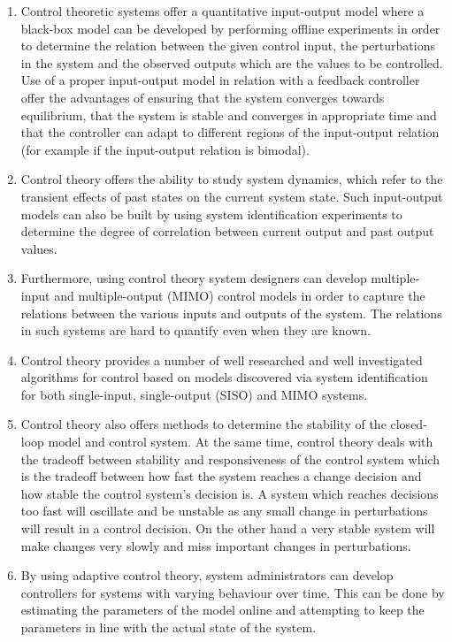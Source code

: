 \begin{enumerate}
	\item Control theoretic systems offer a quantitative input-output model where a black-box model can be developed by performing offline experiments in order to determine the relation between the given control input, the perturbations in the system and the observed outputs which are the values to be controlled. Use of a proper input-output model in relation with a feedback controller offer the advantages of ensuring that the system converges towards equilibrium, that the system is stable and converges in appropriate time and that the controller can adapt to different regions of the input-output relation (for example if the input-output relation is bimodal).
	\item Control theory offers the ability to study system dynamics, which refer to the transient effects of past states on the current system state. Such input-output models can also be built by using system identification experiments to determine the degree of correlation between current output and past output values.
	\item Furthermore, using control theory system designers can develop multiple-input and multiple-output (MIMO) control models in order to capture the relations between the various inputs and outputs of the system. The relations in such systems are hard to quantify even when they are known.
	\item Control theory provides a number of well researched and well investigated algorithms for control based on models discovered via system identification for both single-input, single-output (SISO) and MIMO systems.
	\item Control theory also offers methods to determine the stability of the closed-loop model and control system. At the same time, control theory deals with the tradeoff between stability and responsiveness of the control system which is the tradeoff between how fast the system reaches a change decision and how stable the control system's decision is. A system which reaches decisions too fast will oscillate and be unstable as any small change in perturbations will result in a control decision. On the other hand a very stable system will make changes very slowly and miss important changes in perturbations.
	\item By using adaptive control theory, system administrators can develop controllers for systems with varying behaviour over time. This can be done by estimating the parameters of the model online and attempting to keep the parameters in line with the actual state of the system.
\end{enumerate}

